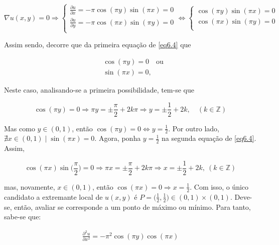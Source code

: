 \begin{equation}\label{eq6.4}
	\nabla u(x,y) = 0 \Rightarrow 
	\begin{cases}
		\frac{\partial u}{\partial x} = -\pi \cos(\pi y) \sin(\pi x) = 0 \\
		\frac{\partial u}{\partial y} = -\pi\cos(\pi x) \sin(\pi y) = 0 \\
	\end{cases}
	\Leftrightarrow 
	\begin{cases}
		\cos(\pi y) \sin(\pi x) = 0 \\
		\cos(\pi x) \sin(\pi y) = 0 \\
	\end{cases}
\end{equation}

Assim sendo, decorre que da primeira equação de \ref{eq6.4} que 

\begin{equation}
	\begin{aligned}
		&\cos(\pi y) = 0 \quad  \text{ou}\\
		&\sin(\pi x) = 0,
	\end{aligned}
\end{equation}


Neste caso, analisando-se a primeira possibilidade, tem-se que

\begin{equation}
	\cos(\pi y) = 0 \Rightarrow \pi y = \pm \frac{\pi}{2} + 2k\pi \Rightarrow y = \pm \frac{1}{2} + 2k,  \quad (k \in \mathbb{Z})
\end{equation}

Mas como $ y \in (0,1) $, então $ \cos(\pi y) = 0 \Leftrightarrow y = \frac{1}{2} $. Por outro lado, $ \nexists x \in (0,1) \mid \sin(\pi x) = 0 $. Agora, ponha $ y = \frac{1}{2} $ na segunda equação de \ref{eq6.4}. Assim, 

\begin{equation}
	\cos(\pi x) \sin\bigg(\frac{\pi}{2}\bigg) = 0 \Rightarrow \pi x = \pm \frac{\pi}{2} + 2k\pi  \Rightarrow x = \pm \frac{1}{2} + 2k, \ (k \in \mathbb{Z})
\end{equation}

mas, novamente, $ x \in (0,1) $, então $ \cos(\pi x) = 0 \Rightarrow x = \frac{1}{2} $. Com isso, o único candidato a extremante local de $ u(x,y) $ é $ P = \big(\frac{1}{2},\frac{1}{2}\big) \in (0,1) \times (0,1) $. Deve-se, então, avaliar se corresponde a um ponto de máximo ou mínimo. Para tanto, sabe-se que:

\begin{equation}
	\begin{aligned}
		\frac{\partial^{2} u}{\partial x^{2}} = -\pi^{2}\cos(\pi y)\cos(\pi x) 
	\end{aligned}
\end{equation}


